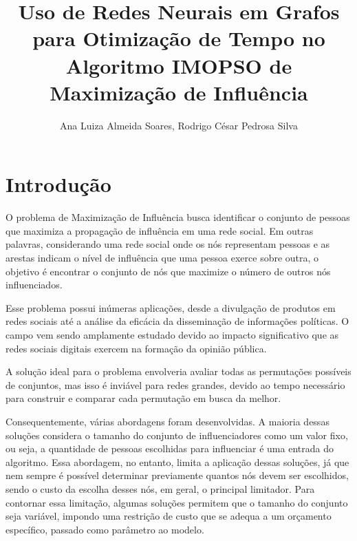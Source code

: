 \documentclass[12pt]{article}
\title{Uso de Redes Neurais em Grafos para Otimização de Tempo no Algoritmo IMOPSO de Maximização de Influência} %
\author{Ana Luiza Almeida Soares\inst{1}, Rodrigo César Pedrosa Silva\inst{1}} %
\begin{document}
\maketitle %

     

\section{Introdução}

O problema de Maximização de Influência busca identificar o conjunto de pessoas que maximiza a propagação de influência em uma rede social. Em outras palavras, considerando uma rede social onde os nós representam pessoas e as arestas indicam o nível de influência que uma pessoa exerce sobre outra, o objetivo é encontrar o conjunto de nós que maximize o número de outros nós influenciados.

Esse problema possui inúmeras aplicações, desde a divulgação de produtos em redes sociais até a análise da eficácia da disseminação de informações políticas. O campo vem sendo amplamente estudado devido ao impacto significativo que as redes sociais digitais exercem na formação da opinião pública.

A solução ideal para o problema envolveria avaliar todas as permutações possíveis de conjuntos, mas isso é inviável para redes grandes, devido ao tempo necessário para construir e comparar cada permutação em busca da melhor. 

Consequentemente, várias abordagens foram desenvolvidas. A maioria dessas soluções considera o tamanho do conjunto de influenciadores como um valor fixo, ou seja, a quantidade de pessoas escolhidas para influenciar é uma entrada do algoritmo. Essa abordagem, no entanto, limita a aplicação dessas soluções, já que nem sempre é possível determinar previamente quantos nós devem ser escolhidos, sendo o custo da escolha desses nós, em geral, o principal limitador. Para contornar essa limitação, algumas soluções permitem que o tamanho do conjunto seja variável, impondo uma restrição de custo que se adequa a um orçamento específico, passado como parâmetro ao modelo.
\end{document}
